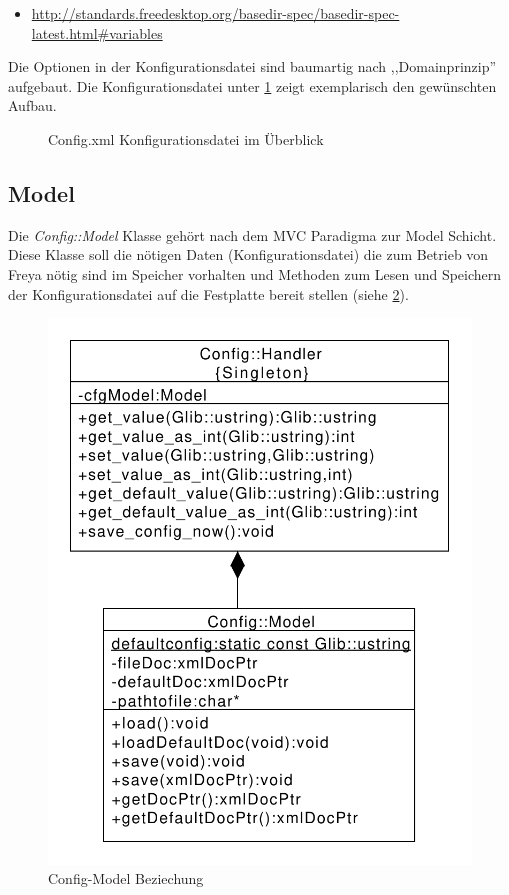 \begin{itemize}
    \item \url{http://standards.freedesktop.org/basedir-spec/basedir-spec-latest.html#variables}
\end{itemize}

Die Optionen in der Konfigurationsdatei sind baumartig nach ,,Domainprinzip'' aufgebaut. Die Konfigurationsdatei unter \ref{c_config}
zeigt exemplarisch den gewünschten Aufbau.

\begin{figure}[htb!]
    
    \caption{Config.xml Konfigurationsdatei im Überblick}
    \label{c_config}
\end{figure}


\subsection{Model}
Die \emph{Config::Model} Klasse gehört nach dem MVC Paradigma zur Model Schicht. Diese Klasse soll die nötigen Daten (Konfigurationsdatei)
die zum Betrieb von Freya nötig sind im Speicher vorhalten und Methoden zum Lesen und Speichern der Konfigurationsdatei auf die Festplatte bereit stellen (siehe \ref{c_confmod}).

\begin{figure}[htb!]
    \centering
    \includegraphics[scale=0.6]{./gfx/class/hand_model}
    \caption{Config-Model Beziechung}
    \label{c_confmod}
\end{figure}


